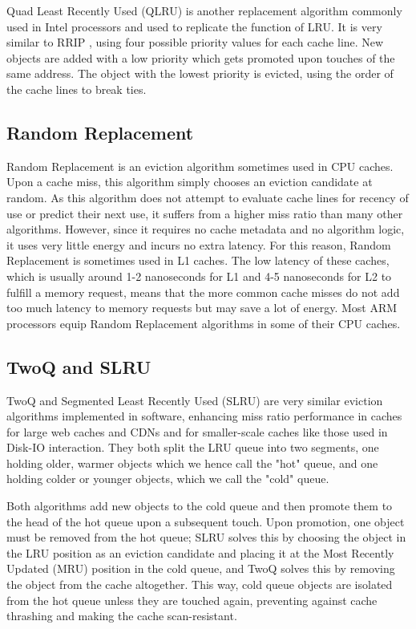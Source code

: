 \documentclass[letterpaper]{article}
\begin{document}
Quad Least Recently Used (QLRU) is another replacement algorithm
commonly used in Intel processors and used to replicate the function of LRU.
It is very similar to RRIP \cite{RRIP}, using four possible priority values for each cache line.
New objects are added with a low priority which gets promoted upon touches of the same address.
The object with the lowest priority is evicted, using the order of the cache lines to break ties.

\subsection{Random Replacement}

Random Replacement is an eviction algorithm sometimes used in CPU caches.
Upon a cache miss, this algorithm simply chooses an eviction candidate at random.
As this algorithm does not attempt to evaluate cache lines for recency of use
or predict their next use, it suffers from a higher miss ratio than many other algorithms.
However, since it requires no cache metadata and no algorithm logic,
it uses very little energy and incurs no extra latency.
For this reason, Random Replacement is sometimes used in L1 caches.
The low latency of these caches, which is usually around 1-2 nanoseconds for L1
and 4-5 nanoseconds for L2 to fulfill a memory request,
means that the more common cache misses do not add too much latency to memory requests
but may save a lot of energy.
Most ARM processors equip Random Replacement algorithms in some of their CPU caches.

\subsection{TwoQ and SLRU}

TwoQ \cite{TwoQ} and Segmented Least Recently Used (SLRU) \cite{SLRU}
are very similar eviction algorithms implemented in software,
enhancing miss ratio performance in caches for large web caches and CDNs
and for smaller-scale caches like those used in Disk-IO interaction.
They both split the LRU queue into two segments, one holding older, warmer objects
which we hence call the "hot" queue,
and one holding colder or younger objects,
which we call the "cold" queue.

Both algorithms add new objects to the cold queue
and then promote them to the head of the hot queue upon a subsequent touch.
Upon promotion, one object must be removed from the hot queue;
SLRU solves this by choosing the object in the LRU position as an eviction candidate
and placing it at the Most Recently Updated (MRU) position in the cold queue,
and TwoQ solves this by removing the object from the cache altogether.
This way, cold queue objects are isolated from the hot queue unless they are touched again,
preventing against cache thrashing and making the cache scan-resistant.
\end{document}
